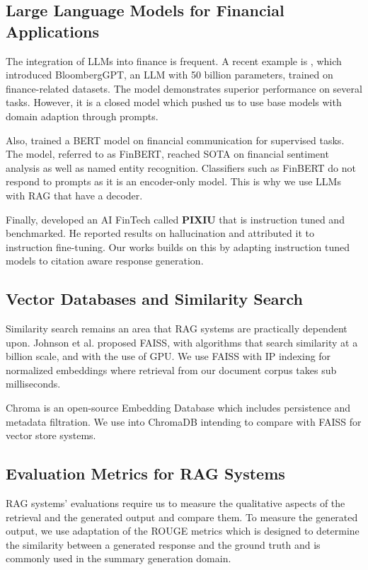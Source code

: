 \documentclass[runningheads]{llncs}
\begin{document}
\subsection{Large Language Models for Financial Applications}

The integration of LLMs into finance is frequent. A recent example is \cite{wu2023bloomberggpt}, which introduced BloombergGPT, an LLM with 50 billion parameters, trained on finance-related datasets. The model demonstrates superior performance on several tasks. However, it is a closed model which pushed us to use base models with domain adaption through prompts. 

Also, \cite{chen2023finbert} trained a BERT model on financial communication for supervised tasks. The model, referred to as FinBERT, reached SOTA on financial sentiment analysis as well as named entity recognition. Classifiers such as FinBERT do not respond to prompts as it is an encoder-only model. This is why we use LLMs with RAG that have a decoder.

Finally, \cite{xie2023pixiu} developed an AI FinTech called \textbf{PIXIU} that is instruction tuned and benchmarked. He reported results on hallucination and attributed it to instruction fine-tuning. Our works builds on this by adapting instruction tuned models to citation aware response generation.



\subsection{Vector Databases and Similarity Search}

Similarity search remains an area that RAG systems are practically dependent upon. Johnson et al.\cite{johnson2019faiss} proposed FAISS, with algorithms that search similarity at a billion scale, and with the use of GPU. We use FAISS with IP indexing for normalized embeddings where retrieval from our document corpus takes sub milliseconds.

Chroma \cite{chroma2023} is an open-source Embedding Database which includes persistence and metadata filtration. We use into ChromaDB intending to compare with FAISS for vector store systems.


\subsection{Evaluation Metrics for RAG Systems}

RAG systems' evaluations require us to measure the qualitative aspects of the retrieval and the generated output and compare them. To measure the generated output, we use adaptation of the ROUGE metrics \cite{lin2004rouge} which is designed to determine the similarity between  a generated response and the ground truth and is commonly used in the summary generation domain. 
\end{document}
